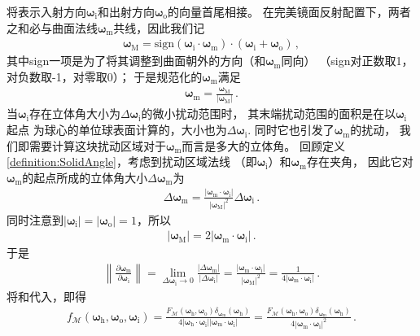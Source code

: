 将表示入射方向${\bm\omega}_{\mathrm{i}}$和出射方向${\bm\omega}_{\mathrm{o}}$的向量首尾相接。
在完美镜面反射配置下，两者之和必与曲面法线${\bm\omega}_{\mathrm{m}}$共线，因此我们记
\begin{align}
    {\bm\omega}_{\mathrm{M}}=\mathrm{sign}({\bm\omega}_{\mathrm{i}}\cdot{\bm\omega}_{\mathrm{m}})
    \cdot({\bm\omega}_{\mathrm{i}}+{\bm\omega}_{\mathrm{o}})\, ,
\end{align}
其中sign一项是为了将其调整到曲面朝外的方向（和${\bm\omega}_{\mathrm{m}}$同向）
（sign对正数取1，对负数取-1，对零取0）；
于是规范化的${\bm\omega}_{\mathrm{m}}$满足
\begin{align}
    {\bm\omega}_{\mathrm{m}}=\frac{{\bm\omega}_{\mathrm{M}}}{|{\bm\omega}_{\mathrm{M}}|}\, .
\end{align}
当${\bm\omega}_{\mathrm{i}}$存在立体角大小为$\Delta{\bm\omega}_{\mathrm{i}}$的微小扰动范围时，
其末端扰动范围的面积是在以${\bm\omega}_{\mathrm{i}}$起点
为球心的单位球表面计算的，大小也为$\Delta{\bm\omega}_{\mathrm{i}}$.
同时它也引发了${\bm\omega}_{\mathrm{m}}$的扰动，
我们即需要计算这块扰动区域对于${\bm\omega}_{\mathrm{m}}$而言是多大的立体角。
回顾定义\ref{definition:SolidAngle}，考虑到扰动区域法线
（即${\bm\omega}_{\mathrm{i}}$）和${\bm\omega}_{\mathrm{m}}$存在夹角，
因此它对${\bm\omega}_{\mathrm{m}}$的起点所成的立体角大小$\Delta{\bm\omega}_{\mathrm{m}}$为
\begin{align}
    \Delta{\bm\omega}_{\mathrm{m}}=\frac{|{\bm\omega}_{\mathrm{m}}\cdot{\bm\omega}_{\mathrm{i}}|}
    {|{\bm\omega}_{\mathrm{M}}|^2}\Delta{\bm\omega}_{\mathrm{i}}\, .
\end{align}
同时注意到$|{\bm\omega}_{\mathrm{i}}|=|{\bm\omega}_{\mathrm{o}}|=1$，所以
\begin{align}
    |{\bm\omega}_{\mathrm{M}}|=2|{\bm\omega}_{\mathrm{m}}\cdot{\bm\omega}_{\mathrm{i}}|\, .
\end{align}
于是
\begin{align}\label{eq:08ex01-JacobianRefraction}
    \left\lVert\frac{\partial{\bm\omega}_{\mathrm{m}}}{\partial{\bm\omega}_{\mathrm{i}}}\right\rVert
    =\lim\limits_{\Delta{\bm\omega}_{\mathrm{i}}\to0}\frac{|\Delta{\bm\omega}_{\mathrm{m}}|}{|\Delta{\bm\omega}_{\mathrm{i}}|}
    =\frac{|{\bm\omega}_{\mathrm{m}}\cdot{\bm\omega}_{\mathrm{i}}|}{|{\bm\omega}_{\mathrm{M}}|^2}
    =\frac{1}{4|{\bm\omega}_{\mathrm{m}}\cdot{\bm\omega}_{\mathrm{i}}|}\, .
\end{align}
将和代入，即得
\begin{align}
    f_{\mathcal{M}}({\bm\omega}_{\mathrm{h}},{\bm\omega}_{\mathrm{o}},{\bm\omega}_{\mathrm{i}})
    =\frac{F_{\mathcal{M}}({\bm\omega}_{\mathrm{h}},{\bm\omega}_{\mathrm{o}})
    \delta_{{\bm\omega}_{\mathrm{m}}}({\bm\omega}_{\mathrm{h}})}
    {4|{\bm\omega}_{\mathrm{h}}\cdot{\bm\omega}_{\mathrm{i}}|
    |{\bm\omega}_{\mathrm{m}}\cdot{\bm\omega}_{\mathrm{i}}|}
    =\frac{F_{\mathcal{M}}({\bm\omega}_{\mathrm{h}},{\bm\omega}_{\mathrm{o}})
    \delta_{{\bm\omega}_{\mathrm{m}}}({\bm\omega}_{\mathrm{h}})}
    {4|{\bm\omega}_{\mathrm{m}}\cdot{\bm\omega}_{\mathrm{i}}|^2}\, .
\end{align}
